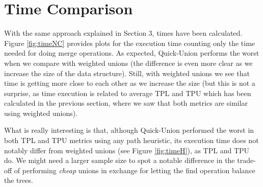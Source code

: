 \section{Time Comparison}
With the same approach explained in Section 3, times have been calculated. Figure \ref{fig:timeNC} provides plots for the execution time counting only the time needed for doing merge operations. As expected, Quick-Union performs the worst when we compare with weighted unions (the difference is even more clear as we increase the size of the data structure). Still, with weighted unions we see that time is getting more close to each other as we increase the size (but this is not a surprise, as time execution is related to average TPL and TPU which has been calculated in the previous section, where we saw that both metrics are similar using weighted unions).



What is really interesting is that, although Quick-Union performed the worst in both TPL and TPU metrics using any path heuristic, its execution time does not notably differ from weighted unions (see Figure \ref{fig:timeH}), as TPL and TPU do. We might need a larger sample size to spot a notable difference in the trade-off of performing \textit{cheap} unions in exchange for letting the find operation balance the trees.

